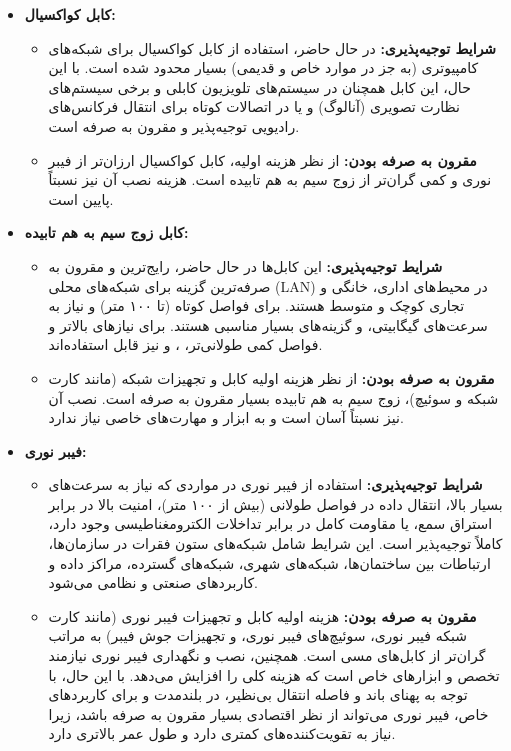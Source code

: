 \begin{itemize}
	\item \textbf{کابل کواکسیال:}
	\begin{itemize}
		\item \textbf{شرایط توجیه‌پذیری:} در حال حاضر، استفاده از کابل کواکسیال برای شبکه‌های کامپیوتری (به جز در موارد خاص و قدیمی) بسیار محدود شده است. با این حال، این کابل همچنان در سیستم‌های تلویزیون کابلی و برخی سیستم‌های نظارت تصویری (آنالوگ) و یا در اتصالات کوتاه برای انتقال فرکانس‌های رادیویی توجیه‌پذیر و مقرون به صرفه است.
		
		\item \textbf{مقرون به صرفه بودن:} از نظر هزینه اولیه، کابل کواکسیال ارزان‌تر از فیبر نوری و کمی گران‌تر از زوج سیم به هم تابیده است. هزینه نصب آن نیز نسبتاً پایین است.
	\end{itemize}
	
	\item \textbf{کابل زوج سیم به هم تابیده:}
	\begin{itemize}
		\item \textbf{شرایط توجیه‌پذیری:} این کابل‌ها در حال حاضر، رایج‌ترین و مقرون به صرفه‌ترین گزینه برای شبکه‌های محلی (LAN) در محیط‌های اداری، خانگی و تجاری کوچک و متوسط هستند. برای فواصل کوتاه (تا ۱۰۰ متر) و نیاز به سرعت‌های گیگابیتی،  و  گزینه‌های بسیار مناسبی هستند. برای نیازهای بالاتر و فواصل کمی طولانی‌تر، ،  و  نیز قابل استفاده‌اند.
		
		\item \textbf{مقرون به صرفه بودن:} از نظر هزینه اولیه کابل و تجهیزات شبکه (مانند کارت شبکه و سوئیچ)، زوج سیم به هم تابیده بسیار مقرون به صرفه است. نصب آن نیز نسبتاً آسان است و به ابزار و مهارت‌های خاصی نیاز ندارد.
	\end{itemize}
	
	\item \textbf{فیبر نوری:}
	\begin{itemize}
		\item \textbf{شرایط توجیه‌پذیری:} استفاده از فیبر نوری در مواردی که نیاز به سرعت‌های بسیار بالا، انتقال داده در فواصل طولانی (بیش از ۱۰۰ متر)، امنیت بالا در برابر استراق سمع، یا مقاومت کامل در برابر تداخلات الکترومغناطیسی وجود دارد، کاملاً توجیه‌پذیر است. این شرایط شامل شبکه‌های ستون فقرات در سازمان‌ها، ارتباطات بین ساختمان‌ها، شبکه‌های شهری، شبکه‌های گسترده، مراکز داده و کاربردهای صنعتی و نظامی می‌شود.
		
		\item \textbf{مقرون به صرفه بودن:} هزینه اولیه کابل و تجهیزات فیبر نوری (مانند کارت شبکه فیبر نوری، سوئیچ‌های فیبر نوری، و تجهیزات جوش فیبر) به مراتب گران‌تر از کابل‌های مسی است. همچنین، نصب و نگهداری فیبر نوری نیازمند تخصص و ابزارهای خاص است که هزینه کلی را افزایش می‌دهد. با این حال، با توجه به پهنای باند و فاصله انتقال بی‌نظیر، در بلندمدت و برای کاربردهای خاص، فیبر نوری می‌تواند از نظر اقتصادی بسیار مقرون به صرفه باشد، زیرا نیاز به تقویت‌کننده‌های کمتری دارد و طول عمر بالاتری دارد.
	\end{itemize}
\end{itemize}